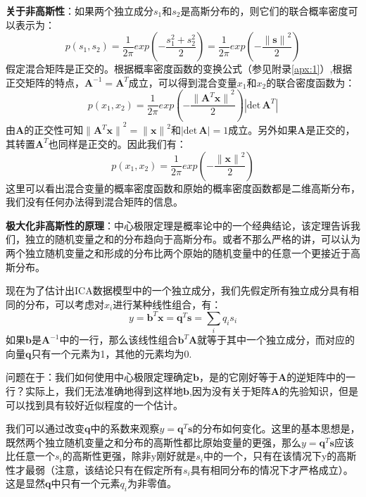 \textbf{关于非高斯性}：如果两个独立成分$s_1$和$s_2$是高斯分布的，则它们的联合概率密度可以表示为：
\begin{equation}
p(s_1,s_2)
=\frac{1}{2\pi}exp(-\frac{s_1^2+s_2^2}{2})
=\frac{1}{2\pi}exp(-\frac{{\lVert \mathbf{s} \rVert}^2}{2})
\end{equation}
假定混合矩阵是正交的。根据概率密度函数的变换公式（参见附录\ref{apx:1}）,根据正交矩阵的特点，$\textbf{A}^{-1}=\textbf{A}^T$成立，可以得到混合变量$x_1$和$x_2$的联合密度函数为：
\begin{equation}
p(x_1,x_2)
=\frac{1}{2\pi}exp(-\frac{{\lVert \mathbf{A}^T\mathbf{x} \rVert}^2}{2})|\text{det}\,\mathbf{A}^T|    
\end{equation}
由$\mathbf{A}$的正交性可知${\lVert \mathbf{A}^T\mathbf{x} \rVert}^2={\lVert \mathbf{x} \rVert}^2$和$|\text{det}\,\mathbf{A}|=1$成立。另外如果$\textbf{A}$是正交的，其转置$\textbf{A}^T$也同样是正交的。因此我们有：
\begin{equation}
p(x_1,x_2)
=\frac{1}{2\pi}exp(-\frac{{\lVert \mathbf{x} \rVert}^2}{2})
\end{equation}
这里可以看出混合变量的概率密度函数和原始的概率密度函数都是二维高斯分布，我们没有任何办法得到混合矩阵的信息。

\textbf{极大化非高斯性的原理}：中心极限定理是概率论中的一个经典结论，该定理告诉我们，独立的随机变量之和的分布趋向于高斯分布。或者不那么严格的讲，可以认为两个独立随机变量之和形成的分布比两个原始的随机变量中的任意一个更接近于高斯分布。

现在为了估计出ICA数据模型中的一个独立成分，我们先假定所有独立成分具有相同的分布，可以考虑对$x_i$进行某种线性组合，有：
\begin{equation}
    y=\mathbf{b}^T\mathbf{x}=\mathbf{q}^T\mathbf{s}=\sum_{i}q_is_i
\end{equation}
如果$\mathbf{b}$是$\mathbf{A}^{-1}$中的一行，那么该线性组合$\mathbf{b}^T\mathbf{A}$就等于其中一个独立成分，而对应的向量$\mathbf{q}$只有一个元素为1，其他的元素均为0.

问题在于：我们如何使用中心极限定理确定$\mathbf{b}$，是的它刚好等于$\mathbf{A}$的逆矩阵中的一行？实际上，我们无法准确地得到这样地$\mathbf{b}$,因为没有关于矩阵$\mathbf{A}$的先验知识，但是可以找到具有较好近似程度的一个估计。

我们可以通过改变$\mathbf{q}$中的系数来观察$y=\mathbf{q}^T\mathbf{s}$的分布如何变化。这里的基本思想是，既然两个独立随机变量之和分布的高斯性都比原始变量的更强，那么$y=\mathbf{q}^T\mathbf{s}$应该比任意一个$s_i$的高斯性更强，除非y刚好就是$s_i$中的一个，只有在该情况下y的高斯性才最弱（注意，该结论只有在假定所有$s_i$具有相同分布的情况下才严格成立）。这是显然$\mathbf{q}$中只有一个元素$q_i$为非零值。

